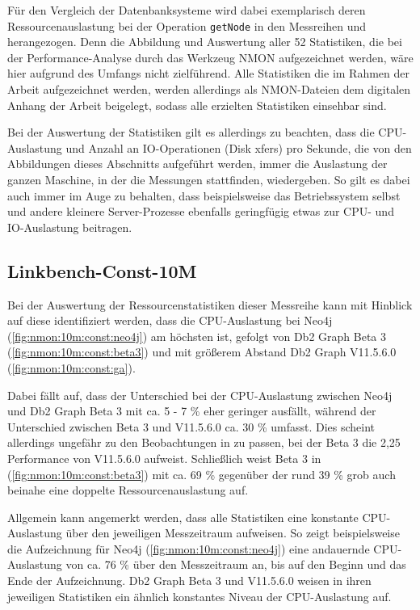 Für den Vergleich der Datenbanksysteme wird dabei exemplarisch deren Ressourcenauslastung bei der Operation \texttt{getNode} in den Messreihen  und  herangezogen. Denn die Abbildung und Auswertung aller 52 Statistiken, die bei der Performance-Analyse durch das Werkzeug NMON aufgezeichnet werden, wäre hier aufgrund des Umfangs nicht zielführend. Alle Statistiken die im Rahmen der Arbeit aufgezeichnet werden, werden allerdings als NMON-Dateien dem digitalen Anhang der Arbeit beigelegt, sodass alle erzielten Statistiken einsehbar sind.

Bei der Auswertung der Statistiken gilt es allerdings zu beachten, dass die CPU-Auslastung und Anzahl an IO-Ope\-ra\-ti\-on\-en (Disk xfers) pro Sekunde, die von den Abbildungen dieses Abschnitts aufgeführt werden, immer die Auslastung der ganzen Maschine, in der die Messungen stattfinden, wiedergeben. So gilt es dabei auch immer im Auge zu behalten, dass beispielsweise das Betriebssystem selbst und andere kleinere Server-Prozesse ebenfalls geringfügig etwas zur CPU- und IO-Aus\-last\-ung beitragen.  

\subsection{Linkbench-Const-10M}
\label{auswertung:ressourcenauslastung:const}
Bei der Auswertung der Ressourcenstatistiken dieser Messreihe kann mit Hinblick auf diese identifiziert werden, dass die CPU-Auslastung bei Neo4j (\autoref{fig:nmon:10m:const:neo4j}) am höchsten ist, gefolgt von Db2 Graph Beta 3 (\autoref{fig:nmon:10m:const:beta3}) und mit größerem Abstand Db2 Graph V11.5.6.0 (\autoref{fig:nmon:10m:const:ga}). 

Dabei fällt auf, dass der Unterschied bei der CPU-Auslastung zwischen Neo4j und Db2 Graph Beta 3 mit ca. 5 - 7 \% eher geringer ausfällt, während der Unterschied zwischen Beta 3 und V11.5.6.0 ca. 30 \% umfasst. Dies scheint allerdings ungefähr zu den Beobachtungen in  zu passen, bei der Beta 3 die 2,25 Performance von V11.5.6.0 aufweist. Schließlich weist Beta 3 in (\autoref{fig:nmon:10m:const:beta3}) mit ca. 69 \% gegenüber der rund 39 \% grob auch beinahe eine doppelte Ressourcenauslastung auf.

Allgemein kann angemerkt werden, dass alle Statistiken eine konstante CPU-Auslastung über den jeweiligen Messzeitraum aufweisen. So zeigt beispielsweise die Aufzeichnung für Neo4j (\autoref{fig:nmon:10m:const:neo4j}) eine andauernde CPU-Auslastung von ca. 76 \% über den Messzeitraum an, bis auf den Beginn und das Ende der Aufzeichnung. Db2 Graph Beta 3 und V11.5.6.0 weisen in ihren jeweiligen Statistiken ein ähnlich konstantes Niveau der CPU-Auslastung auf. 

